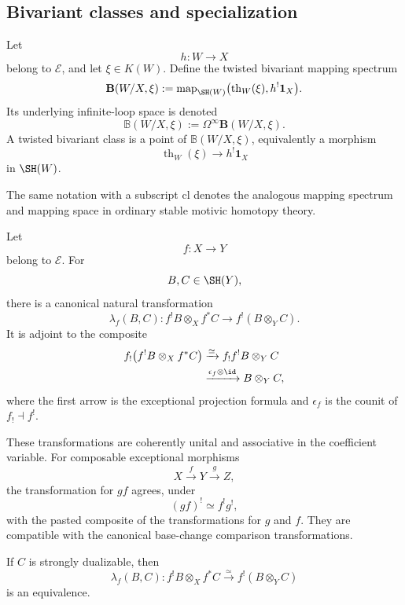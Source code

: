 \subsection{Bivariant classes and specialization}

\begin{definition}
\label{def:twisted-bivariant-classes}
Let
\[
    h:W\longrightarrow X
\]
belong to \(\mathcal E\), and let \(\xi\in K(W)\).  Define the twisted
bivariant mapping spectrum
\[
    \mathbf B(W/X,\xi)
    :=
    \operatorname{map}_{\SH(W)}
    \bigl(
      \operatorname{th}_W(\xi),
      h^!\mathbf1_X
    \bigr).
\]
Its underlying infinite-loop space is denoted
\[
    \mathbb B(W/X,\xi)
    :=
    \Omega^\infty\mathbf B(W/X,\xi).
\]
A twisted bivariant class is a point of
\(\mathbb B(W/X,\xi)\), equivalently a morphism
\[
    \operatorname{th}_W(\xi)
    \longrightarrow
    h^!\mathbf1_X
\]
in \(\SH(W)\).

The same notation with a subscript \({\mathrm{cl}}\) denotes the analogous
mapping spectrum and mapping space in ordinary stable motivic homotopy
theory.
\end{definition}

\begin{proposition}
\label{prop:exceptional-inverse-module-structure}
Let
\[
    f:X\longrightarrow Y
\]
belong to \(\mathcal E\).  For
\[
    B,C\in\SH(Y),
\]
there is a canonical natural transformation
\[
    \lambda_f(B,C):
    f^!B\otimes_Xf^*C
    \longrightarrow
    f^!(B\otimes_YC).
\]
It is adjoint to the composite
\[
\begin{aligned}
    f_!
    \bigl(
      f^!B\otimes_Xf^*C
    \bigr)
    &\xrightarrow{\simeq}
    f_!f^!B\otimes_YC \\
    &\xrightarrow{\epsilon_f\otimes\id}
    B\otimes_YC,
\end{aligned}
\]
where the first arrow is the exceptional projection formula and
\(\epsilon_f\) is the counit of \(f_!\dashv f^!\).

These transformations are coherently unital and associative in the
coefficient variable.  For composable exceptional morphisms
\[
    X\xrightarrow{f}Y\xrightarrow{g}Z,
\]
the transformation for \(gf\) agrees, under
\[
    (gf)^!\simeq f^!g^!,
\]
with the pasted composite of the transformations for \(g\) and \(f\).
They are compatible with the canonical base-change comparison
transformations.

If \(C\) is strongly dualizable, then
\[
    \lambda_f(B,C):
    f^!B\otimes_Xf^*C
    \xrightarrow{\simeq}
    f^!(B\otimes_YC)
\]
is an equivalence.
\end{proposition}

